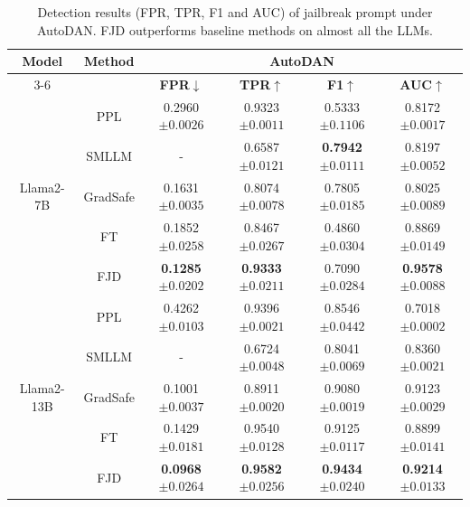 \documentclass{article}
\begin{document}
\begin{table}[t]
  \caption{Detection results (FPR, TPR, F1 and AUC) of jailbreak prompt under AutoDAN. FJD outperforms baseline methods on almost all the LLMs.}
  \label{auto auc}

  \centering
  \setlength\tabcolsep{14pt}
  \footnotesize

  \begin{tabular}{cccccc}
    \toprule
    \multirow{2}{*}{\textbf{Model}}  &  \multirow{2}{*}{\textbf{Method}} & \multicolumn{4}{c}{\textbf{AutoDAN}} \\
    \cmidrule(r){3-6}

    & & \textbf{FPR$\downarrow$} & \textbf{TPR$\uparrow$}  & \textbf{F1$\uparrow$} & \textbf{AUC$\uparrow$} \\
    
    \midrule
    \multirow{5}{*}{Llama2-7B} 
    & PPL  & 0.2960\tiny{$\pm 0.0026$} & 0.9323\tiny{$\pm 0.0011$} & 0.5333\tiny{$\pm 0.1106$} & 0.8172\tiny{$\pm 0.0017$}     \\
    & SMLLM & - & 0.6587\tiny{$\pm 0.0121$} & \textbf{0.7942}\tiny{$\pm 0.0111$} & 0.8197\tiny{$\pm 0.0052$}       \\
    & GradSafe & 0.1631\tiny{$\pm 0.0035$} & 0.8074\tiny{$\pm 0.0078$} & 0.7805\tiny{$\pm 0.0185$} & 0.8025\tiny{$\pm 0.0089$}   \\
    & FT & 0.1852\tiny{$\pm 0.0258$} & 0.8467\tiny{$\pm 0.0267$}   &0.4860\tiny{$\pm 0.0304$}&  0.8869\tiny{$\pm 0.0149$} \\
    & FJD & \textbf{0.1285}\tiny{$\pm 0.0202$} & \textbf{0.9333}\tiny{$\pm 0.0211$}   & 0.7090\tiny{$\pm 0.0284$}& \textbf{0.9578}\tiny{$\pm 0.0088$}  \\
    \midrule
    \multirow{5}{*}{Llama2-13B} 
    & PPL & 0.4262\tiny{$\pm 0.0103$} & 0.9396\tiny{$\pm 0.0021$} & 0.8546\tiny{$\pm 0.0442$} & 0.7018\tiny{$\pm 0.0002$}     \\
    & SMLLM & - & 0.6724\tiny{$\pm 0.0048$} & 0.8041\tiny{$\pm 0.0069$} & 0.8360\tiny{$\pm 0.0021$}    \\
    & GradSafe & 0.1001\tiny{$\pm 0.0037$} & 0.8911\tiny{$\pm 0.0020$} & 0.9080\tiny{$\pm 0.0019$} & 0.9123\tiny{$\pm 0.0029$} \\
    & FT & 0.1429\tiny{$\pm 0.0181$}& 0.9540\tiny{$\pm 0.0128$} & 0.9125\tiny{$\pm 0.0117$} & 0.8899\tiny{$\pm 0.0141$}   \\
    & FJD & \textbf{0.0968}\tiny{$\pm 0.0264$} & \textbf{0.9582}\tiny{$\pm 0.0256$} & \textbf{0.9434}\tiny{$\pm 0.0240$} & \textbf{0.9214}\tiny{$\pm 0.0133$}    \\


\end{tabular}
\end{table}
\end{document}
